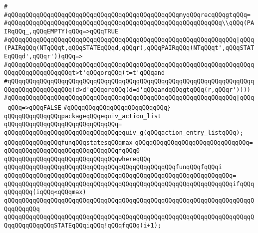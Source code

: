 \verb|#|\newline
\verb|#qQQqqQQqqQQqqQQqqQQqqQQqqQQqqQQqqQQqqQQqqQQqqQQqmyqQQqrecqQQqgtqQQq=|\newline
\verb|#qQQqqQQqqQQqqQQqqQQqqQQqqQQqqQQqqQQqqQQqqQQqqQQqqQQqqQQqqQQq\\qQQq(PAIRqQQq_,qQQqEMPTY)qQQq=>qQQqTRUE|\newline
\verb|#qQQqqQQqqQQqqQQqqQQqqQQqqQQqqQQqqQQqqQQqqQQqqQQqqQQqqQQqqQQqqQQq|\verb#|qQQq(PAIRqQQq(NTqQQqt,qQQqSTATEqQQqd,qQQqr),qQQqPAIRqQQq(NTqQQqt',qQQqSTATEqQQqd',qQQqr'))qQQq=>#\newline
\verb|#qQQqqQQqqQQqqQQqqQQqqQQqqQQqqQQqqQQqqQQqqQQqqQQqqQQqqQQqqQQqqQQqqQQqqQQqqQQqqQQqqQQqqQQqt>t'qQQqorqQQq(t=t'qQQqand|\newline
\verb|#qQQqqQQqqQQqqQQqqQQqqQQqqQQqqQQqqQQqqQQqqQQqqQQqqQQqqQQqqQQqqQQqqQQqqQQqqQQqqQQqqQQqqQQq(d>d'qQQqorqQQq(d=d'qQQqandqQQqgtqQQq(r,qQQqr'))))|\newline
\verb|#qQQqqQQqqQQqqQQqqQQqqQQqqQQqqQQqqQQqqQQqqQQqqQQqqQQqqQQqqQQqqQQq|\verb#|qQQq_qQQq=>qQQqFALSE#\newline
\verb|#qQQqqQQqqQQqqQQqqQQqqQQqqQQq}|\newline
\newline
\verb|qQQqqQQqqQQqqQQqpackageqQQqequiv_action_list|\newline
\verb|qQQqqQQqqQQqqQQqqQQqqQQqqQQqqQQq=|\newline
\verb|qQQqqQQqqQQqqQQqqQQqqQQqqQQqqQQqequiv_g(qQQqaction_entry_listqQQq);|\newline
\newline
\verb|qQQqqQQqqQQqqQQqfunqQQqstatesqQQqmax|\newline
\verb|qQQqqQQqqQQqqQQqqQQqqQQqqQQqqQQq=|\newline
\verb|qQQqqQQqqQQqqQQqqQQqqQQqqQQqqQQqfqQQq0|\newline
\verb|qQQqqQQqqQQqqQQqqQQqqQQqqQQqqQQqwhereqQQq|\newline
\newline
\verb|qQQqqQQqqQQqqQQqqQQqqQQqqQQqqQQqqQQqqQQqqQQqqQQqfunqQQqfqQQqi|\newline
\verb|qQQqqQQqqQQqqQQqqQQqqQQqqQQqqQQqqQQqqQQqqQQqqQQqqQQqqQQqqQQqqQQq=|\newline
\verb|qQQqqQQqqQQqqQQqqQQqqQQqqQQqqQQqqQQqqQQqqQQqqQQqqQQqqQQqqQQqqQQqifqQQqqQQqqQQq(iqQQq<qQQqmax)|\newline
\verb|qQQqqQQqqQQqqQQqqQQqqQQqqQQqqQQqqQQqqQQqqQQqqQQqqQQqqQQqqQQqqQQqqQQqqQQqqQQqqQQq|\newline
\verb|qQQqqQQqqQQqqQQqqQQqqQQqqQQqqQQqqQQqqQQqqQQqqQQqqQQqqQQqqQQqqQQqqQQqqQQqqQQqqQQqqQQqSTATEqQQqiqQQq!qQQqfqQQq(i+1);|\newline
